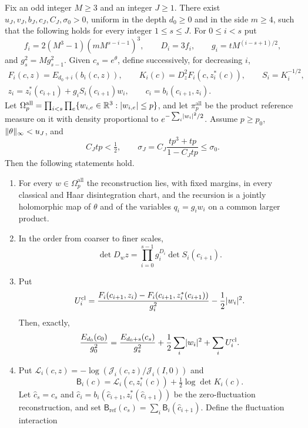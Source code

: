 \begin{theorem}\label{ch09:thm:sequential-density}
Fix an odd integer $M\ge3$ and an integer $J\ge1$. There exist $u_J,v_J,b_J,c_J,C_J,\sigma_0>0$, uniform in the depth $d_0\ge0$ and in the side $m\ge4$, such that the following holds for every integer $1\le s\le J$. For $0\le i<s$ put
\[
 f_i=2(M^3-1)(mM^{s-i-1})^3,\qquad D_i=3f_i,\qquad g_i=tM^{(i-s+1)/2},
\]
and $g_s^2=Mg_{s-1}^2$. Given $c_s=e^\theta$, define successively, for decreasing $i$,
\begin{gather*}
 F_i(c,z)=E_{d_0+i}(b_i(c,z)),\qquad K_i(c)=D_z^2F_i(c,z_i^*(c)),\qquad S_i=K_i^{-1/2},\\
 z_i=z_i^*(c_{i+1})+g_iS_i(c_{i+1})w_i,\qquad c_i=b_i(c_{i+1},z_i).
\end{gather*}
Let $\Omega_p^{\mathrm{all}}=\prod_{i<s}\prod_e\{w_{i,e}\in\mathbb R^3:\lvert w_{i,e}\rvert\le p\}$, and let $\pi_p^{\mathrm{all}}$ be the product reference measure on it with density proportional to $e^{-\sum_i\lvert w_i\rvert^2/2}$. Assume $p\ge p_0$, $\lVert \theta\rVert_\infty<u_J$, and
\begin{equation}\label{ch09:eq:sequential-conditions}
 C_Jtp<\tfrac12,\qquad \sigma_J=C_J\frac{tp^3+tp}{1-C_Jtp}\le\sigma_0.
\end{equation}
Then the following statements hold.
\begin{enumerate}
\item For every $w\in\Omega_p^{\mathrm{all}}$ the reconstruction lies, with fixed margins, in every classical and Haar disintegration chart, and the recursion is a jointly holomorphic map of $\theta$ and of the variables $q_i=g_iw_i$ on a common larger product.
\item In the order from coarser to finer scales,
\[
 \det D_wz=\prod_{i=0}^{s-1}g_i^{D_i}\det S_i(c_{i+1}).
\]
\item Put
\[
 U_i^{\mathrm{cl}}=\frac{F_i(c_{i+1},z_i)-F_i(c_{i+1},z_i^*(c_{i+1}))}{g_i^2}-\frac12\lvert w_i\rvert^2.
\]
Then, exactly,
\[
 \frac{E_{d_0}(c_0)}{g_0^2}=\frac{E_{d_0+s}(c_s)}{g_s^2}+\frac12\sum_i\lvert w_i\rvert^2+\sum_iU_i^{\mathrm{cl}}.
\]
\item Put $\mathcal L_i(c,z)=-\log(\mathcal J_i(c,z)/\mathcal J_i(I,0))$ and
\[
 \mathsf B_i(c)=\mathcal L_i(c,z_i^*(c))+\tfrac12\log\det K_i(c).
\]
Let $\widehat c_s=c_s$ and $\widehat c_i=b_i(\widehat c_{i+1},z_i^*(\widehat c_{i+1}))$ be the zero-fluctuation reconstruction, and set $\mathsf B_{\mathrm{ref}}(c_s)=\sum_i\mathsf B_i(\widehat c_{i+1})$. Define the fluctuation interaction
\begin{equation}\label{ch09:eq:sequential-interaction}

\end{equation}
\end{enumerate}
\end{theorem}
